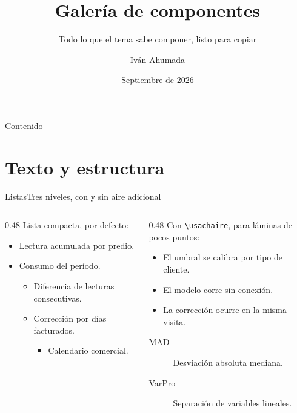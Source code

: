 \documentclass[11pt,aspectratio=169,xcolor=table]{beamer}
\title[Galería de componentes]{Galería de componentes}
\subtitle{Todo lo que el tema sabe componer, listo para copiar}
\author{Iván Ahumada}
\date{Septiembre de 2026}
\institute[USACH]{Universidad de Santiago de Chile}
\begin{document}
\usachportada

\begin{frame}{Contenido}
  \tableofcontents
\end{frame}

\section{Texto y estructura}

\begin{frame}{Listas}{Tres niveles, con y sin aire adicional}
  \begin{columns}[T,onlytextwidth]
    \begin{column}{0.48\textwidth}
      Lista compacta, por defecto:
      \begin{itemize}
        \item Lectura acumulada por predio.
        \item Consumo del período.
          \begin{itemize}
            \item Diferencia de lecturas consecutivas.
            \item Corrección por días facturados.
              \begin{itemize}
                \item Calendario comercial.
              \end{itemize}
          \end{itemize}
      \end{itemize}
    \end{column}
    \begin{column}{0.48\textwidth}
      Con \texttt{\textbackslash usachaire}, para láminas de pocos puntos:
      \begin{itemize}\usachaire
        \item El umbral se calibra por tipo de cliente.
        \item El modelo corre sin conexión.
        \item La corrección ocurre en la misma visita.
      \end{itemize}

      \begin{description}
        \item[MAD] Desviación absoluta mediana.
        \item[VarPro] Separación de variables lineales.
      \end{description}
    \end{column}
  \end{columns}
\end{frame}
\end{document}
